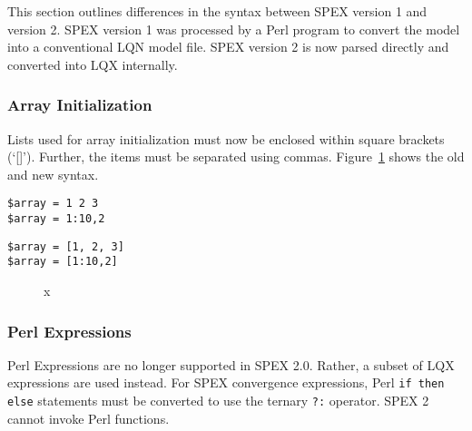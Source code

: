 This section outlines differences in the syntax between SPEX version 1 and version 2.
SPEX version 1 was processed by a Perl program to convert the model into a conventional LQN
model file.  SPEX version 2 is now parsed directly and converted into LQX internally.

\subsubsection{Array Initialization}

Lists used for array initialization must now be enclosed within square brackets
(`[]')\index{[]}.  Further, the items must be separated using
commas. Figure~\ref{fig:spex-array-initialization} shows the old and new syntax.
\newsavebox{\spexone}
\newsavebox{\spextwo}
\begin{lrbox}{\spexone}
\begin{minipage}{.3\textwidth}
\begin{lstlisting}
$array = 1 2 3
$array = 1:10,2
\end{lstlisting}
\end{minipage}
\end{lrbox}
\begin{lrbox}{\spextwo}
\begin{minipage}{.3\textwidth}
\begin{lstlisting}
$array = [1, 2, 3]
$array = [1:10,2]
\end{lstlisting}
\end{minipage}
\end{lrbox}
\begin{figure}
  \centering
  \subfloat[Spex 1]{\usebox{\spexone}}
  \subfloat[Spex 2]{\usebox{\spextwo}}
  \caption{x}
  \label{fig:spex-array-initialization}
\end{figure}

\subsubsection{Perl Expressions}

Perl Expressions are no longer supported in SPEX 2.0.  Rather, a subset of
LQX expressions are used instead.  For SPEX convergence
expressions, Perl \texttt{if then else} statements must be
converted to use the ternary \texttt{?:}
operator.  SPEX 2 cannot invoke Perl functions.

